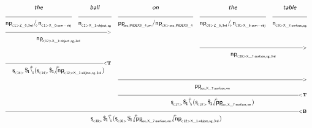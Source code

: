 \documentclass{article}
\newcommand{\deriv}[2]
{  \renewcommand{\arraystretch}{.5}
$\begin{array}[t]{*{#1}{c}}
     #2
   \end{array}$ }
\newcommand{\gf}[1]{\textsf{\textsl{#1}}}
\newcommand{\cf}[1]{\mbox{\ensuremath{\cfont{#1}}}}
\newcommand{\uline}[1]
{\mc{#1}{\hrulefill} }
\newcommand{\mc}[2]
  {\multicolumn{#1}{c}{#2}}
\newcommand{\cfont}{\mathsf}
\newcommand{\bs}{\backslash}
\newcommand{\subsa}[1]{\hspace{-0.75mm}_{_{#1}}}
\newcommand{\subsb}[1]{\hspace{-0.10mm}_{_{#1}}}
\newcommand{\subs}[1]{\hspace{-0.40mm}_{#1}}
\newcommand{\subsf}[1]{\hspace{-0.75mm}_{_{#1}}}
\newcommand{\supsa}[1]{\hspace{-1.75mm}^{^{#1}} }
\newcommand{\supsb}[1]{\hspace{-0.80mm}^{^{#1}}  }
\begin{document}
\deriv{5}{
\gf{the} & \gf{ball} & \gf{on} & \gf{the} & \gf{table} \\
\uline{1} & \uline{1} & \uline{1} & \uline{1} & \uline{1} \\
\cf{np \subsf{   < 1 >  Z \_ 0 ,  3rd } / \subsa{\diamond} n \subsf{   < 1 >  X \_ 0:sem-obj } } & \cf{n \subsf{   < 2 >  X \_ 1:object ,  sg } } & \cf{pp \subsf{  acc ,  INDEX3 \_ 4 ,  on } / np \subsf{   < 6 >  acc ,  INDEX3 \_ 4 } } & \cf{np \subsf{   < 8 >  Z \_ 6 ,  3rd } / \subsa{\diamond} n \subsf{   < 8 >  X \_ 6:sem-obj } } & \cf{n \subsf{   < 9 >  X \_ 7:surface ,  sg } } \\
 \mc{2} {\hrulefill_{>}} \\
 \mc{2}{\cf{np \subsf{   < 12 >  X \_ 1:object ,  sg ,  3rd } }} \\
&&& \mc{2} {\hrulefill_{>}} \\
&&& \mc{2}{\cf{np \subsf{   < 20 >  X \_ 7:surface ,  sg ,  3rd } }} \\
 \mc{2} {\hrulefill_{<\mathbf{T}}}\\
 \mc{2}{\cf{s \subsf{ < 14 > } \$ \subs{1}\bs \supsa{+} \hspace{-0.50mm} \subsb{i} (s \subsf{ < 14 > } \$ \subs{1}/ \supsb{+} \hspace{-1.45mm} \subsa{i} np \subsf{   < 12 >  X \_ 1:object ,  sg ,  3rd } )}} \\
&& \mc{3} {\hrulefill_{>}} \\
&& \mc{3}{\cf{pp \subsf{  acc ,  X \_ 7:surface ,  on } }} \\
&& \mc{3} {\hrulefill_{<\mathbf{T}}}\\
&& \mc{3}{\cf{s \subsf{ < 27 > } \$ \subs{1}\bs \supsa{+} \hspace{-0.50mm} \subsb{i} (s \subsf{ < 27 > } \$ \subs{1}/ \supsb{+} \hspace{-1.45mm} \subsa{i} pp \subsf{  acc ,  X \_ 7:surface ,  on } )}} \\
 \mc{5} {\hrulefill_{<\mathbf{B}}}\\
 \mc{5}{\cf{s \subsf{ < 38 > } \$ \subs{1}\bs \supsa{+} \hspace{-0.50mm} \subsb{i} (s \subsf{ < 38 > } \$ \subs{1}/ \supsb{+} \hspace{-1.45mm} \subsa{i} pp \subsf{  acc ,  X \_ 7:surface ,  on } / \supsb{+} \hspace{-1.45mm} \subsa{i} np \subsf{   < 12 >  X \_ 1:object ,  sg ,  3rd } )}} \\
}

\vspace{5mm}
\end{document}
